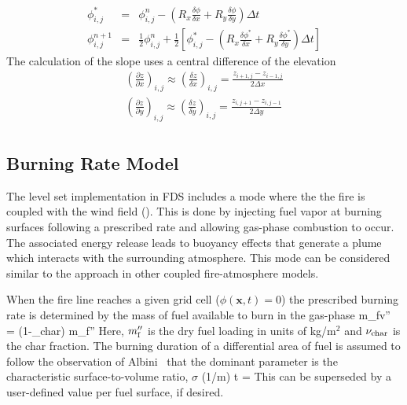 \begin{eqnarray}
\phi_{i, j}^{*} &=& \phi_{i, j}^{n}-\left(R_{x} \frac{\delta \phi}{\delta x}+R_{y} \frac{\delta \phi}{\delta y}\right) \Delta t \\[8pt]
\phi_{i, j}^{n+1} &=& \frac{1}{2} \phi_{i, j}^{n}+\frac{1}{2}\left[\phi_{i, j}^{*}-\left(R_{x} \frac{\delta \phi^{*}}{\delta x}+R_{y} \frac{\delta \phi^{*}}{\delta y}\right) \Delta t\right]
\end{eqnarray}
The calculation of the slope uses a central difference of the elevation
\begin{gather}
\left(\frac{\partial z}{\partial x}\right)_{i, j} \approx \left(\frac{\delta z}{\delta x}\right)_{i, j} =
\frac{z_{i+1, j}-z_{i-1, j}}{2 \Delta x} \\[6pt]
\left(\frac{\partial z}{\partial y}\right)_{i, j} \approx \left(\frac{\delta z}{\delta y}\right)_{i, j} =
\frac{z_{i, j+1}-z_{i, j-1}}{2 \Delta y} \\[6pt]
\end{gather}


\subsection{Burning Rate Model}

The level set implementation in FDS includes a mode where the the fire is coupled with the wind field (). This is done by injecting fuel vapor at burning surfaces following a prescribed rate and allowing gas-phase combustion to occur. The associated energy release leads to buoyancy effects that generate a plume which interacts with the surrounding atmosphere. This mode can be considered similar to the approach in other coupled fire-atmosphere models.

When the fire line reaches a given grid cell ($\phi(\mathbf{x},t)=0$) the prescribed burning rate is determined by the mass of fuel available to burn in the gas-phase
\be
   m_{\rm fv}'' = (1-\nu_{\rm char}) m_{\rm f}''
\ee
Here, $m_{\rm f}''$ is the dry fuel loading in units of kg/m$^2$ and $\nu_{\rm char}$ is the char fraction. The burning duration of a differential area of fuel is assumed to follow the observation of Albini~\cite{Albini:1976} that the dominant parameter is the characteristic surface-to-volume ratio, $\sigma$ (1/m) 
\be
	\delta t = 
\ee
This can be superseded by a user-defined value per fuel surface, if desired.

